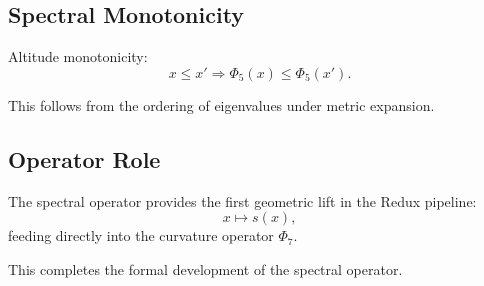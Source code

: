 \subsection{Spectral Monotonicity}

Altitude monotonicity:
\[
x \le x' \Rightarrow \Phi_5(x) \le \Phi_5(x').
\]

This follows from the ordering of eigenvalues under metric expansion.

\subsection{Operator Role}

The spectral operator provides the first geometric lift in the Redux pipeline:
\[
x \mapsto s(x),
\]
feeding directly into the curvature operator $\Phi_7$.

This completes the formal development of the spectral operator.
